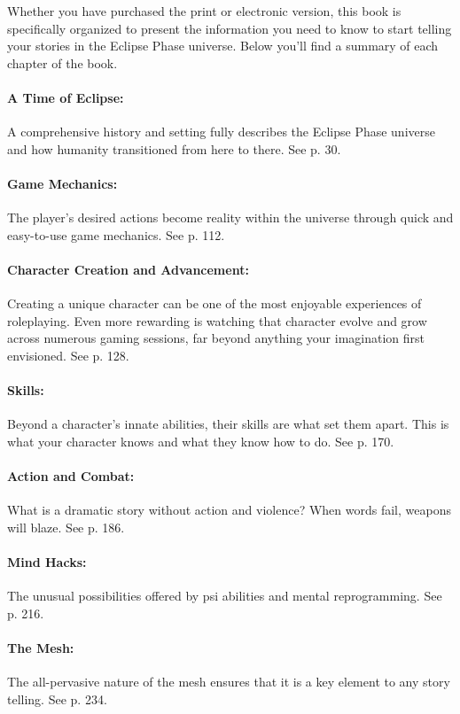 Whether you have purchased the print or electronic version, this book is specifically organized to present the information you need to know to start telling your stories in the Eclipse Phase universe. Below you'll find a summary of each chapter of the book. 

\paragraph{A Time of Eclipse:} A comprehensive history and setting fully describes the Eclipse Phase universe and how humanity transitioned from here to there. See p. 30. 

\paragraph{Game Mechanics:} The player's desired actions become reality within the universe through quick and easy-to-use game mechanics. See p. 112. 

\paragraph{Character Creation and Advancement:} Creating a unique character can be one of the most enjoyable experiences of roleplaying. Even more rewarding is watching that character evolve and grow across numerous gaming sessions, far beyond anything your imagination first envisioned. See p. 128. 

\paragraph{Skills:} Beyond a character's innate abilities, their skills are what set them apart. This is what your character knows and what they know how to do. See p. 170. 

\paragraph{Action and Combat:} What is a dramatic story without action and violence? When words fail, weapons will blaze. See p. 186. 

\paragraph{Mind Hacks:} The unusual possibilities offered by psi abilities and mental reprogramming. See p. 216. 

\paragraph{The Mesh:} The all-pervasive nature of the mesh ensures that it is a key element to any story telling. See p. 234. 

